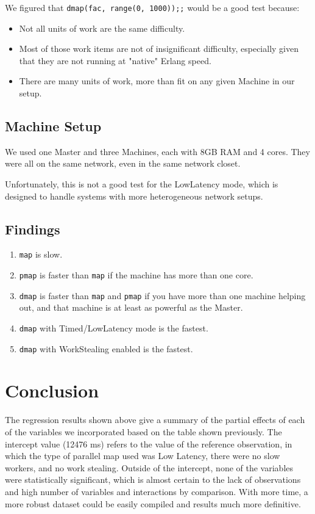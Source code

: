 \documentclass[letterpaper,twocolumn,10pt]{article}
\begin{document}
We figured that \verb|dmap(fac, range(0, 1000));;| would be a good test
because:

\begin{itemize}
    \item Not all units of work are the same difficulty.
    \item Most of those work items are not of insignificant difficulty,
        especially given that they are not running at "native" Erlang speed.
    \item There are many units of work, more than fit on any given Machine in
        our setup.
\end{itemize}

\subsection{Machine Setup}

We used one Master and three Machines, each with 8GB RAM and 4 cores. They were
all on the same network, even in the same network closet.

Unfortunately, this is not a good test for the LowLatency mode, which is
designed to handle systems with more heterogeneous network setups.

\subsection{Findings}

\begin{enumerate}
    \item \verb|map| is slow.
    \item \verb|pmap| is faster than \verb|map| if the machine has more than
        one core.
    \item \verb|dmap| is faster than \verb|map| and \verb|pmap| if you have
        more than one machine helping out, and that machine is at least as
        powerful as the Master.
    \item \verb|dmap| with Timed/LowLatency mode is the fastest.
    \item \verb|dmap| with WorkStealing enabled is the fastest.
\end{enumerate}

\section{Conclusion}

The regression results shown above give a summary of the partial effects of
each of the variables we incorporated based on the table shown previously. The
intercept value (12476 ms) refers to the value of the reference observation, in
which the type of parallel map used was Low Latency, there were no slow
workers, and no work stealing. Outside of the intercept, none of the variables
were statistically significant, which is almost certain to the lack of
observations and high number of variables and interactions by comparison. With
more time, a more robust dataset could be easily compiled and results much more
definitive.
\end{document}
